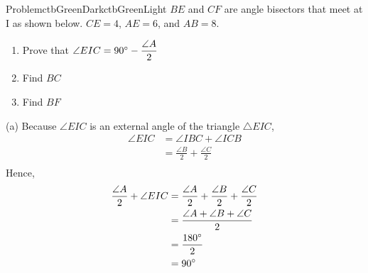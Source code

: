 \documentclass[12pt]{simple_doc}
\begin{document}


    \begin{cbstripe}{Problem}{ctbGreenDark}{ctbGreenLight}
        $BE$ and $CF$ are angle bisectors that meet at I as shown below.
        $CE = 4$, $AE = 6$, and $AB = 8$.
        \begin{enumerate}[label={(\alph*)}]
            \item Prove that $\angle EIC = 90\degree - \displaystyle\frac{\angle A}{2}$
            \item Find $BC$
            \item Find $BF$
        \end{enumerate}

        \begin{center}
        \end{center}
    \end{cbstripe}

    (a) Because $\angle EIC$ is an external angle of the triangle $\triangle EIC$,
    \begin{equation*}
		\begin{aligned}
            \angle EIC &= \angle IBC + \angle ICB\\
                       &= \frac{\angle B}{2} + \frac{\angle C}{2}\\
        \end{aligned}
	\end{equation*}
    Hence,
    \begin{equation*}
		\begin{aligned}
            \frac{\angle A}{2} + \angle EIC
                &= \frac{\angle A}{2} + \frac{\angle B}{2} + \frac{\angle C}{2}\\
                &= \frac{\angle A + \angle B + \angle C}{2}\\
                &= \frac{180\degree}{2}\\
                &= 90\degree
        \end{aligned}
	\end{equation*}
    \medskip
\end{document}
